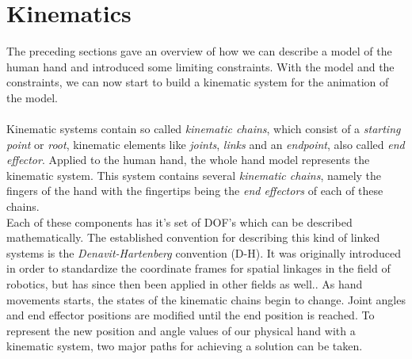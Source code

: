 \section{Kinematics}
\label{sec:kinematics}
The preceding sections gave an overview of how we can describe a model of the human hand and introduced some limiting constraints. With the model and the constraints, we can now start to build a kinematic system for the animation of the model.\\\\
Kinematic systems contain so called \textit{kinematic chains}, which consist of a \textit{starting point} or \textit{root}, kinematic elements like \textit{joints}, \textit{links} and an \textit{endpoint}, also called \textit{end effector}. Applied to the human hand, the whole hand model represents the kinematic system. This system contains several \textit{kinematic chains}, namely the fingers of the hand with the fingertips being the \textit{end effectors} of each of these chains.
\\Each of these components has it's set of DOF's which can be described mathematically. The established convention for describing this kind of linked systems is the \textit{Denavit-Hartenberg} convention (D-H)\cite{Denavit.1955}. It was originally introduced in order to standardize the coordinate frames for spatial linkages in the field of robotics, but has since then been applied in other fields as well.\cite{Spong.2008}.  
As hand movements starts, the states of the kinematic chains begin to change. Joint angles and end effector positions are modified until the end position is reached. To represent the new position and angle values of our physical hand with a kinematic system, two major paths for achieving a solution can be taken.
